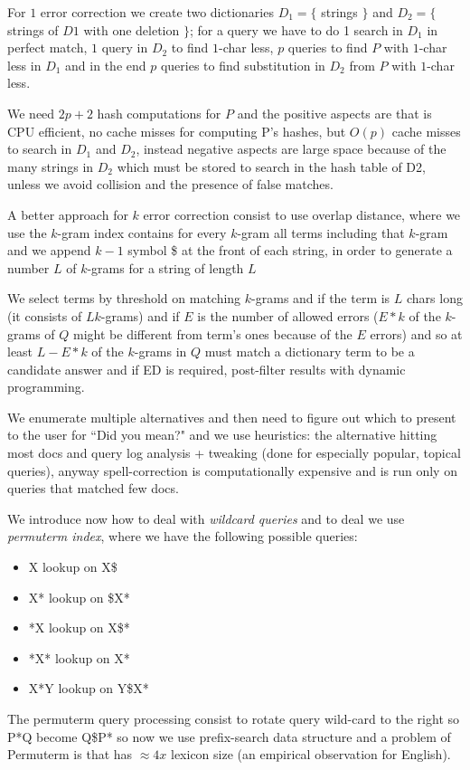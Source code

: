 For $1$ error correction we create two dictionaries $D_1 = \{$ strings $\}$ and $D_2 = \{$ strings of $D1 $ with one deletion $\}$; for a query we have to 
do 1 search in $D_1$ in perfect match, $1$ query in $D_2$ to find $1$-char less, $p$ queries to find $P$ with $1$-char less in $D_1$
and in the end $p$ queries to find substitution in $D_2$ from $P$ with $1$-char less.

We need $2p + 2$ hash computations for $P$ and the positive aspects are that is CPU efficient, no cache misses for computing P’s hashes,
but $O(p)$ cache misses to search in $D_1$ and $D_2$, instead negative aspects are large space because of the many strings in $D_2$ 
which must be stored to search in the hash table of D2, unless we avoid collision and the presence of false matches.

A better approach for $k$ error correction consist to use overlap distance, where we use the $k$-gram index contains for every $k$-gram all terms including
that $k$-gram and we append $k-1$ symbol \$ at the front of each string, in order to generate a number $L$ of $k$-grams 
for a string of length $L$

We select terms by threshold on matching $k$-grams and if the term is $L$ chars long (it consists of $L k$-grams) and if $E$
is the number of allowed errors ($E*k$ of the $k$-grams of $Q$ might be different from term’s ones because of the $E$ errors) and 
so at least $L - E*k$ of the $k$-grams in $Q$ must match a dictionary term to be a candidate answer and if ED is required,
post-filter results with dynamic programming.

We enumerate multiple alternatives and then need to figure out which to present to the user for “Did you mean?" and we use heuristics:
the alternative hitting most docs and query log analysis + tweaking (done for especially popular, topical queries), anyway
spell-correction is computationally expensive and is run only on queries that matched few docs.

We introduce now how to deal with \emph{wildcard queries} and to deal we use \emph{permuterm index}, where we have the 
following possible queries:
\begin{itemize}
    \item X lookup on X\$
    \item X* lookup on   \$X*
    \item *X lookup on X\$*
    \item *X* lookup on X*
    \item X*Y lookup on Y\$X*
\end{itemize}
The permuterm query processing consist to rotate query wild-card to the right so P*Q become Q\$P* so now we 
use prefix-search data structure and a problem of Permuterm is that has $\approx 4x$ lexicon size (an empirical observation for English).

